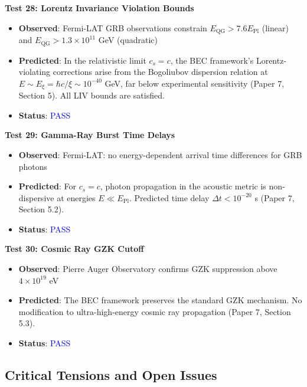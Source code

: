 \documentclass[11pt,a4paper]{article}
\theoremstyle{definition}
\theoremstyle{remark}
\begin{document}
\textbf{Test 28: Lorentz Invariance Violation Bounds}

\begin{itemize}[leftmargin=*, itemsep=0.1em]
\item \textbf{Observed}: Fermi-LAT GRB observations constrain $E_{\mathrm{QG}} > 7.6 E_{\mathrm{Pl}}$ (linear) and $E_{\mathrm{QG}} > 1.3 \times 10^{11}$ GeV (quadratic)
\item \textbf{Predicted}: In the relativistic limit $c_s = c$, the BEC framework's Lorentz-violating corrections arise from the Bogoliubov dispersion relation at $E \sim E_\xi = \hbar c/\xi \sim 10^{-40}$ GeV, far below experimental sensitivity (Paper 7, Section 5). All LIV bounds are satisfied.
\item \textbf{Status}: \textcolor{blue}{PASS}
\end{itemize}

\textbf{Test 29: Gamma-Ray Burst Time Delays}

\begin{itemize}[leftmargin=*, itemsep=0.1em]
\item \textbf{Observed}: Fermi-LAT: no energy-dependent arrival time differences for GRB photons
\item \textbf{Predicted}: For $c_s = c$, photon propagation in the acoustic metric is non-dispersive at energies $E \ll E_{\mathrm{Pl}}$. Predicted time delay $\Delta t < 10^{-20}$ s (Paper 7, Section 5.2).
\item \textbf{Status}: \textcolor{blue}{PASS}
\end{itemize}

\textbf{Test 30: Cosmic Ray GZK Cutoff}

\begin{itemize}[leftmargin=*, itemsep=0.1em]
\item \textbf{Observed}: Pierre Auger Observatory confirms GZK suppression above $4 \times 10^{19}$ eV
\item \textbf{Predicted}: The BEC framework preserves the standard GZK mechanism. No modification to ultra-high-energy cosmic ray propagation (Paper 7, Section 5.3).
\item \textbf{Status}: \textcolor{blue}{PASS}
\end{itemize}

\subsection{Critical Tensions and Open Issues}
\label{sec:critical_tensions}
\end{document}
